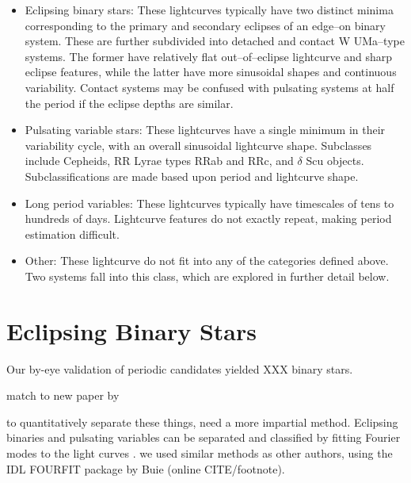 \documentclass[]{emulateapj}
\begin{document}
\begin{itemize}
\item Eclipsing binary stars: These lightcurves typically have two
  distinct minima corresponding to the primary and secondary eclipses
  of an edge--on binary system.  These are further subdivided into
  detached and contact W UMa--type systems.  The former have
  relatively flat out--of--eclipse lightcurve and sharp eclipse
  features, while the latter have more sinusoidal shapes and
  continuous variability.  Contact systems may be confused with
  pulsating systems at half the period if the eclipse depths are
  similar.

\item Pulsating variable stars: These lightcurves have a single
  minimum in their variability cycle, with an overall sinusoidal
  lightcurve shape.  Subclasses include Cepheids, RR Lyrae types RRab
  and RRc, and $\delta$ Scu objects.  Subclassifications are made
  based upon period and lightcurve shape.

\item Long period variables: These lightcurves typically have
  timescales of tens to hundreds of days.  Lightcurve features do not exactly repeat, making period estimation difficult.

\item Other: These lightcurve do not fit into any of the categories
  defined above.  Two systems fall into this class, which are explored
  in further detail below.

\end{itemize}





\section{Eclipsing Binary Stars}
Our by-eye validation of periodic candidates yielded XXX binary stars.

match to new paper by \citet{parks2013,quillen2014}

to quantitatively separate these things, need a more impartial method. Eclipsing binaries and pulsating variables can be separated and classified by fitting Fourier modes to the light curves \citep{pojmanski2002,nefs2012}. we used similar methods as other authors, using the IDL FOURFIT package by Buie (online CITE/footnote).
\end{document}
